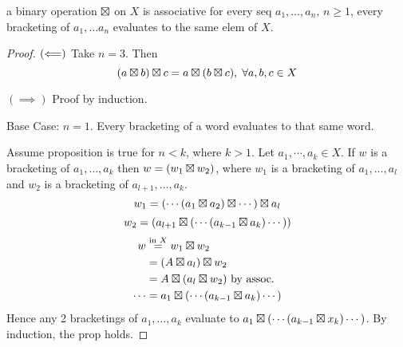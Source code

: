 \documentclass[12pt]{report}
\begin{document}
\bbox
\begin{prop}
  a binary operation \(\boxtimes\) on \(X\) is associative  for every
  seq \(a_1,\dots,a_n,\,n\ge 1\), every bracketing of \(a_1,\dots a_n\) 
  evaluates to the same elem of \(X\).
\end{prop}
\ebox

\begin{proof}
  \((\Longleftarrow)\) Take \(n=3\). Then
  \[(a\boxtimes b)\boxtimes c=a\boxtimes(b\boxtimes c),\;\forall a,b,c\in X\]

  \((\implies)\) Proof by induction.

  Base Case: \(n=1\). Every bracketing of a word evaluates to that same word.
  
  Assume proposition is true for \(n<k\), where \(k>1\). Let \(a_1,\cdots,a_k
  \in X\). If \(w\) is a bracketing of \(a_1,\dots,a_k\) then
  \(w=(w_1\boxtimes w_2)\), where
  \(w_1\) is a bracketing of \(a_1,\dots,a_l\) and \(w_2\) is a bracketing of
  \(a_{l+1},\dots,a_k\).
  \[w_1=(\cdots(a_1\boxtimes a_2)\boxtimes\cdots)\boxtimes a_l\]
  \[w_2=(a_{l+1}\boxtimes(\cdots(a_{k-1}\boxtimes a_k)\cdots))\]
  \begin{equation*}
    \begin{split}
      w&\overset{\text{in }X}=w_1\boxtimes w_2\\
       &=(A\boxtimes a_l)\boxtimes w_2\\
       &=A\boxtimes(a_l\boxtimes w_2)\text{ by assoc.}\\
      \cdots&= a_1\boxtimes(\cdots(a_{k-1}\boxtimes a_k)\cdots)
    \end{split}
  \end{equation*}
  Hence any 2 bracketings of \(a_1,\dots,a_k\) evaluate to \(a_1\boxtimes
  (\cdots(a_{k-1}\boxtimes x_k)\cdots)\). By induction, the prop holds.
\end{proof}


\end{document}
